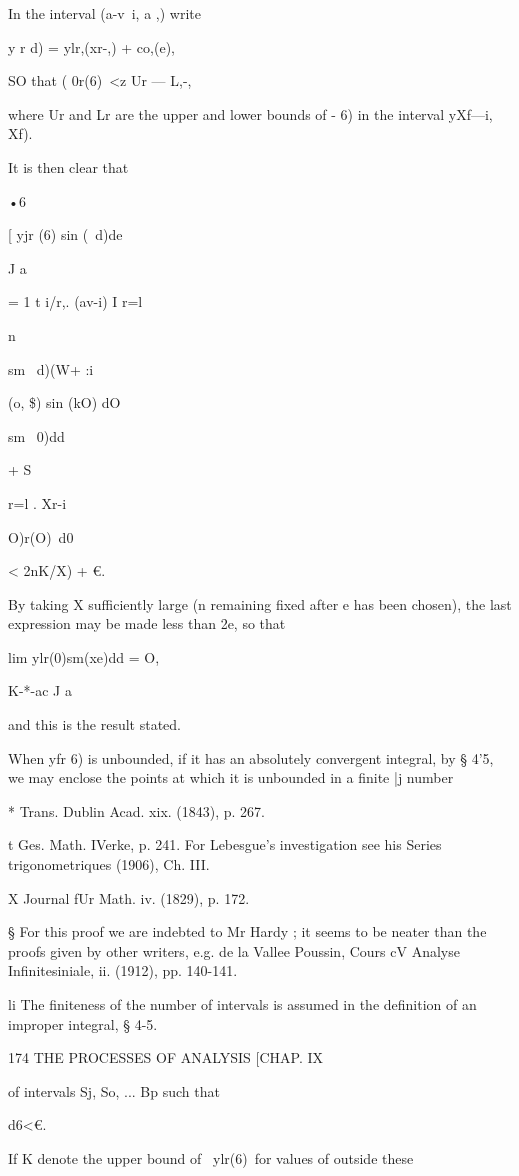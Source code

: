 In the interval (a-v\ i, a ,) write

y r d) = ylr,(xr-,) + co,(e),

SO that ( 0r(6)\ <z Ur — L,-,

where Ur and Lr are the upper and lower bounds of - 6) in the interval
yXf—i, Xf).

It is then clear that

•6

[ yjr (6) sin (\ d)de

J a

= 1 t i/r,. (av-i) I r=l

n

sm \ d)(W+ :i

(o, \$) sin (kO) dO

sm \ 0)dd

+ S

r=l . Xr-i

O)r(O)\ d0

< 2nK/X) + €.

By taking X sufficiently large (n remaining fixed after e has been
chosen), the last expression may be made less than 2e, so that

lim ylr(0)sm(xe)dd = O,

K-*-ac J a

and this is the result stated.

When yfr 6) is unbounded, if it has an absolutely convergent integral,
by § 4'5, we may enclose the points at which it is unbounded in a
finite |j number

* Trans. Dublin Acad. xix. (1843), p. 267.

t Ges. Math. IVerke, p. 241. For Lebesgue's investigation see his
Series trigonometriques (1906), Ch. III.

X Journal fUr Math. iv. (1829), p. 172.

§ For this proof we are indebted to Mr Hardy ; it seems to be neater
than the proofs given by other writers, e.g. de la Vallee Poussin,
Cours cV Analyse Infinitesiniale, ii. (1912), pp. 140-141.

li The finiteness of the number of intervals is assumed in the
definition of an improper integral, § 4-5.

174 THE PROCESSES OF ANALYSIS [CHAP. IX

of intervals Sj, So, ... Bp such that

d6<€.

If K denote the upper bound of \ ylr(6)\ for values of outside these

